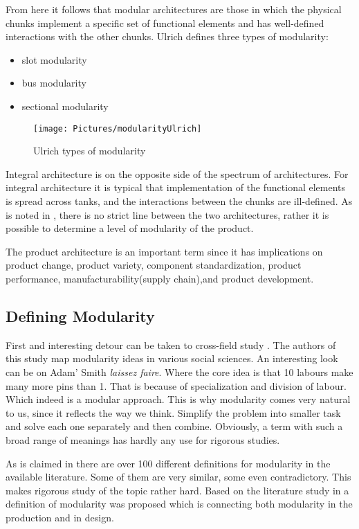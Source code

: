 \documentclass[]{scrartcl}
\begin{document}
		
From here it follows that modular architectures are those in which the physical chunks implement a specific set of functional elements and has well-defined interactions with the other chunks. Ulrich defines three types of modularity:
\begin{itemize}
	\item slot modularity
	\item bus modularity
	\item sectional modularity
\end{itemize}
\begin{figure}[h!]
	\centering
	\texttt{[image: Pictures/modularityUlrich]}
	\caption{Ulrich types of modularity}
	\label{fig:modularityulrich}
	\end{figure}
				
				
Integral architecture is on the opposite side of the spectrum of architectures. For integral architecture it is typical that implementation of the functional elements is spread across tanks, and the interactions between the chunks are ill-defined. As is noted in \cite{Ulrich2004}, there is no strict line between the two architectures, rather it is possible to determine a level of modularity of  the product. 
		
				
The product architecture  is an important term since it has implications on product change, product variety, component standardization, product performance, manufacturability(supply chain),and product development.  



\subsection{Defining Modularity}

First and interesting detour can be taken to cross-field study \cite{Li2006}. The authors of this study map modularity ideas in various social sciences. An interesting look can be on Adam' Smith \emph{laissez faire}. Where the core idea is that 10 labours make many more pins than 1. That is because of specialization and division of labour. Which indeed is a modular approach. This is why modularity comes very natural to us, since it reflects the way we think. Simplify the problem into smaller task and solve each one separately and then combine.  Obviously, a term with such a broad range of meanings has hardly any use for rigorous studies.

As is claimed in \cite{Salvador2007} there are over 100 different definitions for modularity in the available literature. Some of them are very similar, some even contradictory. This makes rigorous study of the topic rather hard.  Based on the literature study in \cite{Salvador2007} a definition of modularity was proposed which is connecting both modularity in the production and in design.  
\end{document}
